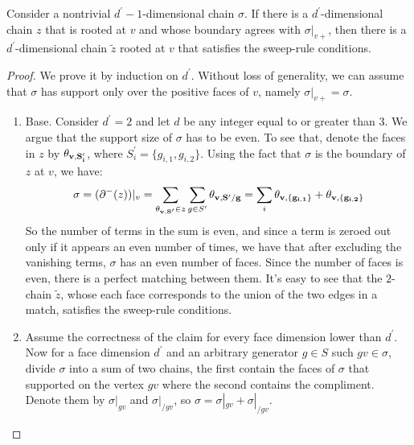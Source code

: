 \begin{claim}
  \label{claim:findcor}
  Consider a nontrivial $d^{\prime}-1$-dimensional chain $\sigma$. If there is a $d^{\prime}$-dimensional chain $z$ that is rooted at $v$ and whose boundary agrees with $\sigma|_{v+}$, then there is a $d^{\prime}$-dimensional chain $\tilde{z}$ rooted at $v$ that satisfies the sweep-rule conditions.
\end{claim}
\begin{proof} 
We prove it by induction on $d^{\prime}$. Without loss of generality, we can assume that $\sigma$ has support only over the positive faces of $v$, namely $\sigma|_{v+} = \sigma$.
  \begin{enumerate}
    \item Base. Consider $d^{\prime} = 2$ and let $d$ be any integer equal to or greater than $3$. We argue that the support size of $\sigma$ has to be even. To see that, denote the faces in $z$ by $\mathbf{\theta_{v ,S^{\prime}_{i}} }$, where $S^{\prime}_{i} = \{g_{i,1},g_{i,2}\}$. Using the fact that $\sigma$ is the boundary of $z$ at $v$, we have:
      \begin{equation*}
        \begin{split}
          \sigma = (\partial^{-}(z))|_{v} = \sum_{ \mathbf{\theta_{v ,S^{\prime}}{} }{} \in z}\sum_{ g \in S^{\prime} } \mathbf{\theta_{v ,S^{\prime } / g } } = \sum_{ i } \mathbf{\theta_{v , \{g_{i,1}\} } }+ \mathbf{\theta_{v , \{g_{i,2}\} } } 
        \end{split}
      \end{equation*}
So the number of terms in the sum is even, and since a term is zeroed out only if it appears an even number of times, we have that after excluding the vanishing terms, $\sigma$ has an even number of faces. Since the number of faces is even, there is a perfect matching between them. It's easy to see that the $2$-chain $\tilde{z}$, whose each face corresponds to the union of the two edges in a match, satisfies the sweep-rule conditions.
    \item Assume the correctness of the claim for every face dimension lower than $d^{\prime}$.   Now for a face dimension $d^{\prime}$ and an arbitrary generator $g \in S$ such $gv \in \sigma$, divide $\sigma$ into a sum of two chains, the first contain the faces of $\sigma$ that supported on the vertex $gv$ where the second contains the compliment. Denote them by $\sigma|_{gv}$ and $\sigma|_{/ gv}$, so $\sigma = \sigma|_{gv} + \sigma|_{/ gv}$. 


\end{enumerate}
\end{proof}
